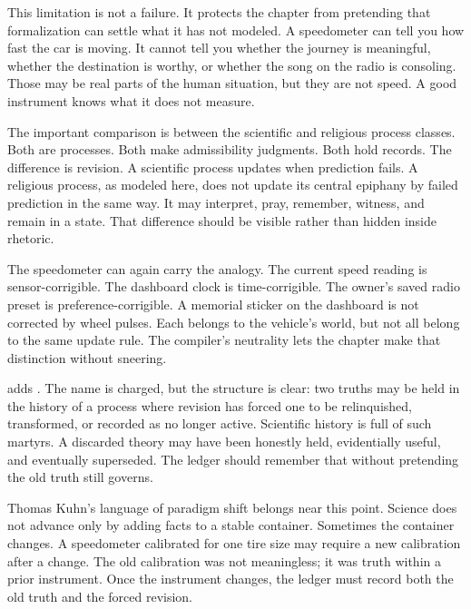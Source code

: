 This limitation is not a failure. It protects the chapter from pretending that
formalization can settle what it has not modeled. A speedometer can tell you
how fast the car is moving. It cannot tell you whether the journey is
meaningful, whether the destination is worthy, or whether the song on the radio
is consoling. Those may be real parts of the human situation, but they are not
speed. A good instrument knows what it does not measure.

The important comparison is between the scientific and religious process
classes. Both are processes. Both make admissibility judgments. Both hold
records. The difference is revision. A scientific process updates when
prediction fails. A religious process, as modeled here, does not update its
central epiphany by failed prediction in the same way. It may interpret, pray,
remember, witness, and remain in a state. That difference should be visible
rather than hidden inside rhetoric.

The speedometer can again carry the analogy. The current speed reading is
sensor-corrigible. The dashboard clock is time-corrigible. The owner's saved
radio preset is preference-corrigible. A memorial sticker on the dashboard is
not corrected by wheel pulses. Each belongs to the vehicle's world, but not all
belong to the same update rule. The compiler's neutrality lets the chapter
make that distinction without sneering.

 adds . The name is charged, but the structure is
clear: two truths may be held in the history of a process where revision has
forced one to be relinquished, transformed, or recorded as no longer active.
Scientific history is full of such martyrs. A discarded theory may have been
honestly held, evidentially useful, and eventually superseded. The ledger
should remember that without pretending the old truth still governs.

Thomas Kuhn's language of paradigm shift belongs near this point. Science does
not advance only by adding facts to a stable container. Sometimes the
container changes. A speedometer calibrated for one tire size may require a new
calibration after a change. The old calibration was not meaningless; it was
truth within a prior instrument. Once the instrument changes, the ledger must
record both the old truth and the forced revision.

